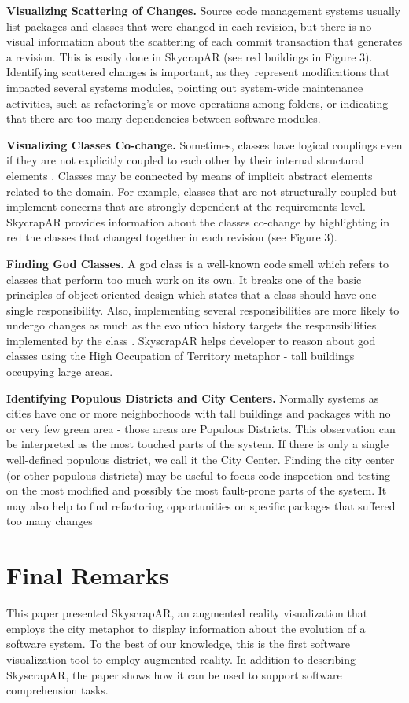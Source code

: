 \textbf{Visualizing Scattering of Changes.} Source code management systems usually list packages and classes that were changed in each revision, but there is no visual information about the scattering of each commit transaction that generates a revision. This is easily done in SkycrapAR (see red buildings in Figure 3). Identifying scattered changes is important, as they represent modifications that impacted several systems modules, pointing out system-wide maintenance activities, such as refactoring’s or move operations among folders, or indicating that there are too many dependencies between software modules. 

\textbf{Visualizing Classes Co-change.} Sometimes, classes have logical couplings even if they are not explicitly coupled to each other by their internal structural elements \cite{gall:1998}. Classes may be connected by means of implicit abstract elements related to the domain. For example, classes that are not structurally coupled but implement concerns that are strongly dependent at the requirements level. SkycrapAR provides information about the classes co-change by highlighting in red the classes that changed together in each revision (see Figure 3). 

\textbf{Finding God Classes.} A god class is a well-known code smell which refers to classes that perform too much work on its own. It breaks one of the basic principles of object-oriented design which states that a class should have one single responsibility. Also, implementing several responsibilities are more likely to undergo changes as much as the evolution history targets the responsibilities implemented by the class \cite{silva:2012}. SkyscrapAR helps developer to reason about god classes using the High Occupation of Territory metaphor - tall buildings occupying large areas.

\textbf{Identifying Populous Districts and City Centers.} Normally systems as cities have one or more neighborhoods with tall buildings and packages with no or very few green area - those areas are Populous Districts. This observation can be interpreted as the most touched parts of the system. If there is only a single well-defined populous district, we call it the City Center. Finding the city center (or other populous districts) may be useful to focus code inspection and testing on the most modified and possibly the most fault-prone parts of the system. It may also help to find refactoring opportunities on specific packages that suffered too many changes

\section{Final Remarks} \label{sec:finalRemarks}
This paper presented SkyscrapAR, an augmented reality visualization that employs the city metaphor to display information about the evolution of a software system. To the best of our knowledge, this is the first software visualization tool to employ augmented reality. In addition to describing SkyscrapAR, the paper shows how it can be used to support software comprehension tasks.

